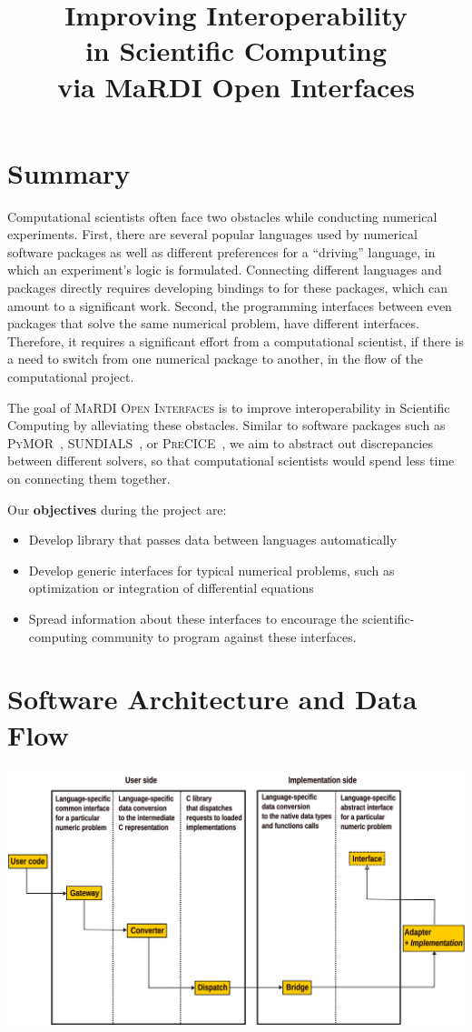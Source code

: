 \documentclass{mmposter}
\title{Improving Interoperability\\in Scientific Computing\\via MaRDI Open Interfaces}
\newcommand{\OIF}{\textsc{MaRDI Open Interfaces}\xspace}
\begin{document}
\maketitle

\section*{Summary}
Computational scientists often face two obstacles while conducting
numerical experiments.
First, there are several popular languages used by numerical
software packages as well as different preferences for a ``driving''
language, in which an experiment's logic is formulated.
Connecting different languages and packages directly requires
developing bindings to for these packages, which can amount
to a significant work.
Second, the programming interfaces between even packages
that solve the same numerical problem, have different interfaces.
Therefore, it requires a significant effort from a computational
scientist, if there is a need to switch from one numerical package
to another, in the flow of the computational project.

The goal of \OIF{} is to improve interoperability in Scientific
Computing by alleviating these obstacles.
Similar to software packages such as \textsc{PyMOR}~\citep{Milk2016},
\textsc{SUNDIALS}~\citep{GardnerEtAl2022},
or \textsc{PreCICE}~\citep{Chourdakis2022},
we aim to abstract out discrepancies between
different solvers, so that computational scientists would spend less time
on connecting them together.

Our \textbf{objectives} during the project are:
\begin{itemize}
  \item Develop library that passes data between languages automatically
  \item Develop generic interfaces for typical numerical problems,
  such as optimization or integration of differential equations
  \item Spread information about these interfaces to encourage
  the scientific-computing community to program against these interfaces.
\end{itemize}

\section*{Software Architecture and Data Flow}
\includegraphics[width=\columnwidth]{arch}
\end{document}

